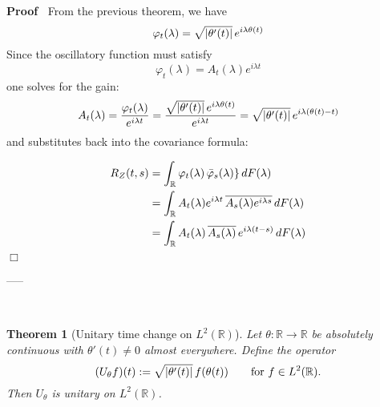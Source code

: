 \documentclass{article}
\newcommand{\assign}{:=}
\newenvironment{proof}{\noindent\textbf{Proof\ }}{\hspace*{\fill}$\Box$\medskip}
\newtheorem{theorem}{Theorem}
\begin{document}
\begin{proof}
  From the previous theorem, we have
  \begin{equation}
    \varphi_t (\lambda) = \sqrt{| \theta' (t) |}  \hspace{0.17em} e^{i \lambda
    \theta (t)}
  \end{equation}
  Since the oscillatory function must satisfy
  \begin{equation}
    \varphi_t (\lambda) = A_t (\lambda) e^{i \lambda t}
  \end{equation}
  one solves for the gain:
  \[ A_t (\lambda) = \frac{\varphi_t (\lambda)}{e^{i \lambda t}} =
     \frac{\sqrt{| \theta' (t) |}  \hspace{0.17em} e^{i \lambda \theta
     (t)}}{e^{i \lambda t}} = \sqrt{| \theta' (t) |}  \hspace{0.17em} e^{i
     \lambda (\theta (t) - t)} \]
  and substitutes back into the covariance formula:
  
  \begin{align}
    R_Z (t, s) & = \int_{\mathbb{R}} \varphi_t (\lambda)  \hspace{0.17em}
    \bar{\varphi}_s (\lambda) \} \hspace{0.17em} dF (\lambda) \\
    & = \int_{\mathbb{R}} A_t (\lambda) e^{i \lambda t} \hspace{0.17em}
    \overline{A_s (\lambda) e^{i \lambda s}} \hspace{0.17em} dF (\lambda) \\
    & = \int_{\mathbb{R}} A_t (\lambda) \hspace{0.17em} \overline{A_s
    (\lambda)} \hspace{0.17em} e^{i \lambda (t - s)}  \hspace{0.17em} dF
    (\lambda) 
  \end{align}
\end{proof}

-----\hrulefill

\

\begin{theorem}
  [Unitary time change on $L^2 (\mathbb{R})$] Let $\theta : \mathbb{R} \to
  \mathbb{R}$ be absolutely continuous with $\theta' (t) \neq 0$ almost
  everywhere. Define the operator
  \[ (U_{\theta} f) (t) \assign \sqrt{| \theta' (t) |}  \hspace{0.17em} f
     (\theta (t))  \qquad \text{for } f \in L^2 (\mathbb{R}) . \]
  Then $U_{\theta}$ is unitary on $L^2 (\mathbb{R})$.
\end{theorem}
\end{document}

